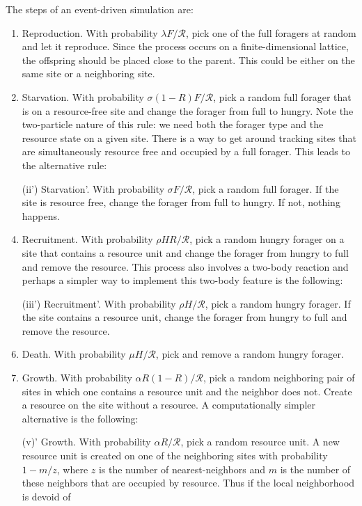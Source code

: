 \documentclass[11pt]{iopart}
\begin{document}
The steps of an event-driven simulation are:
\begin{enumerate}
\item Reproduction.  With probability $\lambda F/\mathcal{R}$, pick one of
  the full foragers at random and let it reproduce.  Since the process occurs
  on a finite-dimensional lattice, the offspring should be placed close to
  the parent.  This could be either on the same site or a neighboring site.
\item Starvation.  With probability $\sigma(1-R)F/\mathcal{R}$, pick a random
  full forager that is on a resource-free site and change the forager from
  full to hungry.  Note the two-particle nature of this rule: we need both
  the forager type and the resource state on a given site.  There is a way to
  get around tracking sites that are simultaneously resource free and
  occupied by a full forager.  This leads to the alternative rule:
\item[(ii')] Starvation'.  With probability $\sigma F/\mathcal{R}$, pick a
  random full forager.  If the site is resource free, change the forager from
  full to hungry.  If not, nothing happens.
\item Recruitment.  With probability $\rho HR/\mathcal{R}$, pick a random
  hungry forager on a site that contains a resource unit and change the
  forager from hungry to full and remove the resource.  This process also
  involves a two-body reaction and perhaps a simpler way to implement this
  two-body feature is the following:
\item[(iii')] Recruitment'.  With probability $\rho H/\mathcal{R}$, pick a
  random hungry forager.  If the site contains a resource unit, change the
  forager from hungry to full and remove the resource.
\item Death.  With probability $\mu H/\mathcal{R}$, pick and remove a random
  hungry forager.
\item Growth.  With probability $\alpha R(1-R)/\mathcal{R}$, pick a random
  neighboring pair of sites in which one contains a resource unit and the
  neighbor does not.  Create a resource on the site without a resource.  A
  computationally simpler alternative is the following:
\item[(v)'] Growth.  With probability $\alpha R/\mathcal{R}$, pick a random
  resource unit.  A new resource unit is created on one of the neighboring
  sites with probability $1-m/z$, where $z$ is the number of
  nearest-neighbors and $m$ is the number of these neighbors that are
  occupied by resource.  Thus if the local neighborhood is devoid of

\end{enumerate}
\end{document}
